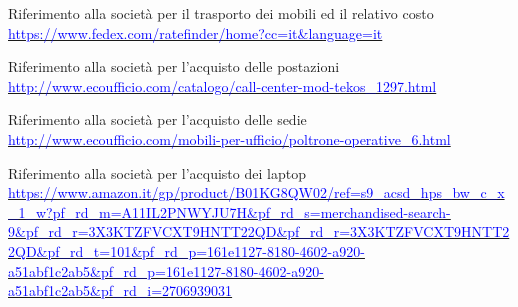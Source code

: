 \begin{thebibliography}{99}
 Riferimento alla società per il trasporto dei mobili ed il relativo costo\newline 
			\href{https://www.fedex.com/ratefinder/home?cc=it\&language=it
}{\textcolor{blue}{https://www.fedex.com/ratefinder/home?cc=it\&language=it}}

 Riferimento alla società per l'acquisto delle postazioni\newline 
			\href{http://www.ecoufficio.com/catalogo/call-center-mod-tekos\_1297.html
}{\textcolor{blue}{http://www.ecoufficio.com/catalogo/call-center-mod-tekos\_1297.html}}

 Riferimento alla società per l'acquisto delle sedie\newline 
			\href{http://www.ecoufficio.com/mobili-per-ufficio/poltrone-operative\_6.html
}{\textcolor{blue}{http://www.ecoufficio.com/mobili-per-ufficio/poltrone-operative\_6.html}}

 Riferimento alla società per l'acquisto dei laptop\newline 
			\href{https://www.amazon.it/gp/product/B01KG8QW02/ref=s9\_acsd\_hps\_bw\_c\_x\_1\_w?pf\_rd\_m=A11IL2PNWYJU7H\&pf\_rd\_s=merchandised-search-9\&pf\_rd\_r=3X3KTZFVCXT9HNTT22QD\&pf\_rd\_r=3X3KTZFVCXT9HNTT22QD\&pf\_rd\_t=101\&pf\_rd\_p=161e1127-8180-4602-a920-a51abf1c2ab5\&pf\_rd\_p=161e1127-8180-4602-a920-a51abf1c2ab5\&pf\_rd\_i=2706939031
}{\textcolor{blue}{https://www.amazon.it/gp/product/B01KG8QW02/ref=s9\_acsd\_hps\_bw\_c\_x\_1\_w?pf\_rd\_m=A11IL2PNWYJU7H\&pf\_rd\_s=merchandised-search-9\&pf\_rd\_r=3X3KTZFVCXT9HNTT22QD\&pf\_rd\_r=3X3KTZFVCXT9HNTT22QD\&pf\_rd\_t=101\&pf\_rd\_p=161e1127-8180-4602-a920-a51abf1c2ab5\&pf\_rd\_p=161e1127-8180-4602-a920-a51abf1c2ab5\&pf\_rd\_i=2706939031}}
		
\end{thebibliography}